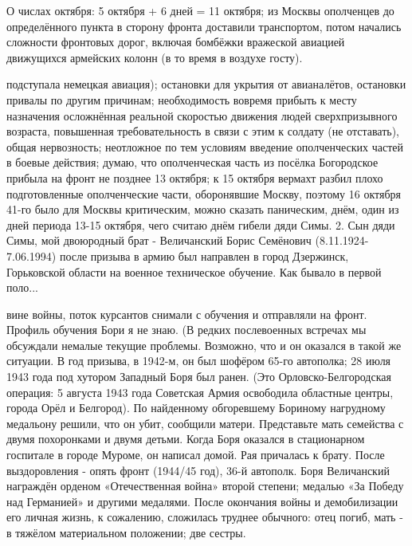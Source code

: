 \label{36-2}
О числах октября: 5 октября + 6 дней = 11 октября; из Москвы ополченцев до определённого пункта в сторону фронта доставили транспортом, потом начались сложности фронтовых дорог, включая бомбёжки вражеской авиацией движущихся армейских колонн (в то время в воздухе госту).

\label{37-1}
подступала немецкая авиация); остановки для укрытия от авианалётов, остановки привалы по другим причинам; необходимость вовремя прибыть к месту назначения осложнённая реальной скоростью движения людей сверхпризывного возраста, повышенная требовательность в связи с этим к солдату (не отставать), общая нервозность; неотложное по тем условиям введение ополченческих частей в боевые действия; думаю, что ополченческая часть из посёлка Богородское прибыла на фронт не позднее 13 октября; к 15 октября вермахт разбил плохо подготовленные ополченческие части, оборонявшие Москву, поэтому 16 октября 41-го было для Москвы критическим, можно сказать паническим, днём, один из дней периода 13-15 октября, чего считаю днём гибели дяди Симы. 2. Сын дяди Симы, мой двоюродный брат - Величанский Борис Семёнович (8.11.1924-7.06.1994) после призыва в армию был направлен в город Дзержинск, Горьковской области на военное техническое обучение. Как бывало в первой поло...

\label{38-1}
вине войны, поток курсантов снимали с обучения и отправляли на фронт. Профиль обучения Бори я не знаю. (В редких послевоенных встречах мы обсуждали немалые текущие проблемы. Возможно, что и он оказался в такой же ситуации. В год призыва, в 1942-м, он был шофёром 65-го автополка; 28 июля 1943 года под хутором Западный Боря был ранен. (Это Орловско-Белгородская операция: 5 августа 1943 года Советская Армия освободила областные центры, города Орёл и Белгород). По найденному обгоревшему Бориному нагрудному медальону решили, что он убит, сообщили матери. Представьте мать семейства с двумя похоронками и двумя детьми. Когда Боря оказался в стационарном госпитале в городе Муроме, он написал домой. Рая причалась к брату. После выздоровления - опять фронт (1944/45 год), 36-й автополк. Боря Величанский награждён орденом «Отечественная война» второй степени; медалью «За Победу над Германией» и другими медалями. После окончания войны и демобилизации его личная жизнь, к сожалению, сложилась труднее обычного: отец погиб, мать - в тяжёлом материальном положении; две сестры.

